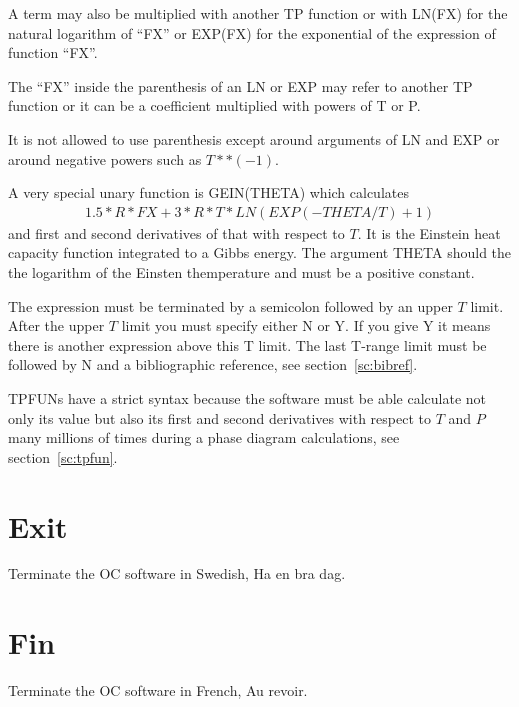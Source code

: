\documentclass[11pt]{article}
\begin{document}
A term may also be multiplied with another TP function or with LN(FX)
for the natural logarithm of ``FX'' or EXP(FX) for the exponential of
the expression of function ``FX''.

The ``FX'' inside the parenthesis of an LN or EXP may refer to another
TP function or it can be a coefficient multiplied with powers of T or
P.

It is not allowed to use parenthesis except around arguments of LN and
EXP or around negative powers such as $T**(-1)$.

A very special unary function is GEIN(THETA) which calculates
\begin{eqnarray}
1.5*R*FX + 3*R*T*LN(EXP(-THETA/T) + 1) 
\end{eqnarray}
and first and second derivatives of that with respect to $T$.  It is
the Einstein heat capacity function integrated to a Gibbs energy.  The
argument THETA should the the logarithm of the Einsten themperature
and must be a positive constant.

The expression must be terminated by a semicolon followed by an upper
$T$ limit.  After the upper $T$ limit you must specify either N or Y.
If you give Y it means there is another expression above this T limit.
The last T-range limit must be followed by N and a bibliographic
reference, see section~\ref{sc:bibref}.

TPFUNs have a strict syntax because the software must be able
calculate not only its value but also its first and second derivatives
with respect to $T$ and $P$ many millions of times during a phase diagram
calculations, see section~\ref{sc:tpfun}.

\hypertarget{Exit}{}
\section{Exit}

Terminate the OC software in Swedish, Ha en bra dag.

\hypertarget{Fin}{}
\section{Fin}

Terminate the OC software in French, Au revoir.

\hypertarget{Help}{}
\hypertarget{Help for which *}{}
\end{document}
